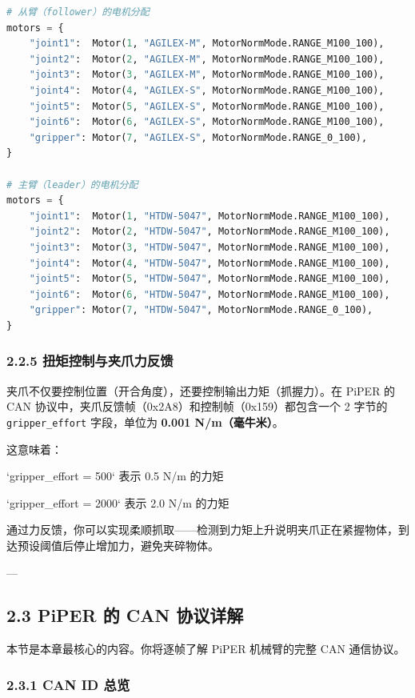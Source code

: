 \documentclass[UTF8,a4paper,11pt]{ctexart}
\begin{document}
\begin{lstlisting}[language=python]
# 从臂（follower）的电机分配
motors = {
    "joint1":  Motor(1, "AGILEX-M", MotorNormMode.RANGE_M100_100),
    "joint2":  Motor(2, "AGILEX-M", MotorNormMode.RANGE_M100_100),
    "joint3":  Motor(3, "AGILEX-M", MotorNormMode.RANGE_M100_100),
    "joint4":  Motor(4, "AGILEX-S", MotorNormMode.RANGE_M100_100),
    "joint5":  Motor(5, "AGILEX-S", MotorNormMode.RANGE_M100_100),
    "joint6":  Motor(6, "AGILEX-S", MotorNormMode.RANGE_M100_100),
    "gripper": Motor(7, "AGILEX-S", MotorNormMode.RANGE_0_100),
}

# 主臂（leader）的电机分配
motors = {
    "joint1":  Motor(1, "HTDW-5047", MotorNormMode.RANGE_M100_100),
    "joint2":  Motor(2, "HTDW-5047", MotorNormMode.RANGE_M100_100),
    "joint3":  Motor(3, "HTDW-5047", MotorNormMode.RANGE_M100_100),
    "joint4":  Motor(4, "HTDW-5047", MotorNormMode.RANGE_M100_100),
    "joint5":  Motor(5, "HTDW-5047", MotorNormMode.RANGE_M100_100),
    "joint6":  Motor(6, "HTDW-5047", MotorNormMode.RANGE_M100_100),
    "gripper": Motor(7, "HTDW-5047", MotorNormMode.RANGE_0_100),
}
\end{lstlisting}

\subsubsection{2.2.5 扭矩控制与夹爪力反馈}

夹爪不仅要控制位置（开合角度），还要控制输出力矩（抓握力）。在 PiPER 的 CAN 协议中，夹爪反馈帧（0x2A8）和控制帧（0x159）都包含一个 2 字节的 \texttt{gripper_effort} 字段，单位为 \textbf{0.001 N/m（毫牛米）}。

这意味着：
\item `gripper_effort = 500` 表示 0.5 N/m 的力矩
\item `gripper_effort = 2000` 表示 2.0 N/m 的力矩

通过力反馈，你可以实现柔顺抓取——检测到力矩上升说明夹爪正在紧握物体，到达预设阈值后停止增加力，避免夹碎物体。

---

\subsection{2.3 PiPER 的 CAN 协议详解}

本节是本章最核心的内容。你将逐帧了解 PiPER 机械臂的完整 CAN 通信协议。

\subsubsection{2.3.1 CAN ID 总览}
\end{document}
